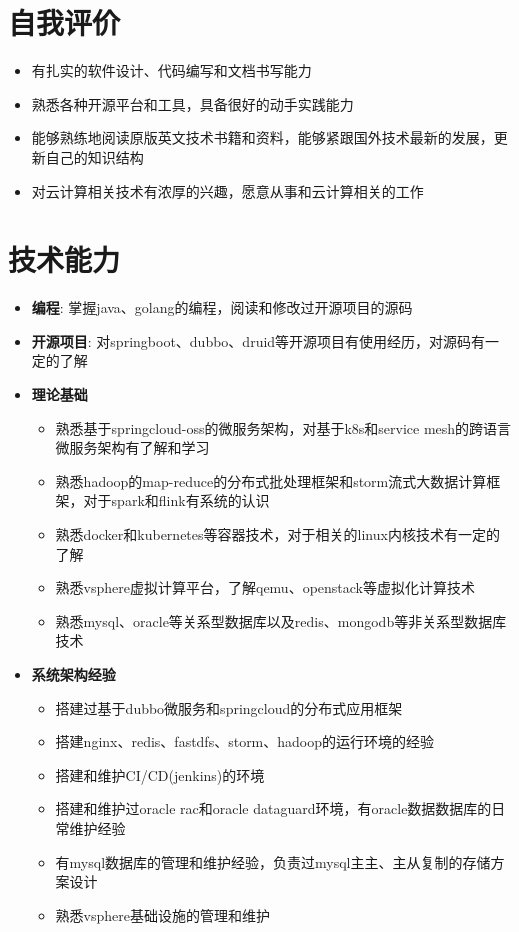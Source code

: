 \documentclass{resume}
\begin{document}



\section{自我评价}
\begin{itemize}
  \item 有扎实的软件设计、代码编写和文档书写能力
  \item 熟悉各种开源平台和工具，具备很好的动手实践能力
  \item 能够熟练地阅读原版英文技术书籍和资料，能够紧跟国外技术最新的发展，更新自己的知识结构
  \item 对云计算相关技术有浓厚的兴趣，愿意从事和云计算相关的工作
\end{itemize}

\section{技术能力}
\begin{itemize}[parsep=0.2ex]
  \item \textbf{编程}: 掌握java、golang的编程，阅读和修改过开源项目的源码
  \item \textbf{开源项目}: 对springboot、dubbo、druid等开源项目有使用经历，对源码有一定的了解
  \item \textbf{理论基础}
    \begin{itemize}
      \item 熟悉基于springcloud-oss的微服务架构，对基于k8s和service mesh的跨语言微服务架构有了解和学习
      \item 熟悉hadoop的map-reduce的分布式批处理框架和storm流式大数据计算框架，对于spark和flink有系统的认识
      \item 熟悉docker和kubernetes等容器技术，对于相关的linux内核技术有一定的了解
      \item 熟悉vsphere虚拟计算平台，了解qemu、openstack等虚拟化计算技术
      \item 熟悉mysql、oracle等关系型数据库以及redis、mongodb等非关系型数据库技术
    \end{itemize}
  \item \textbf{系统架构经验}
    \begin{itemize}
      \item 搭建过基于dubbo微服务和springcloud的分布式应用框架
      \item 搭建nginx、redis、fastdfs、storm、hadoop的运行环境的经验
      \item 搭建和维护CI/CD(jenkins)的环境
      \item 搭建和维护过oracle rac和oracle dataguard环境，有oracle数据数据库的日常维护经验
      \item 有mysql数据库的管理和维护经验，负责过mysql主主、主从复制的存储方案设计
      \item 熟悉vsphere基础设施的管理和维护
    \end{itemize}
\end{itemize}
\end{document}
